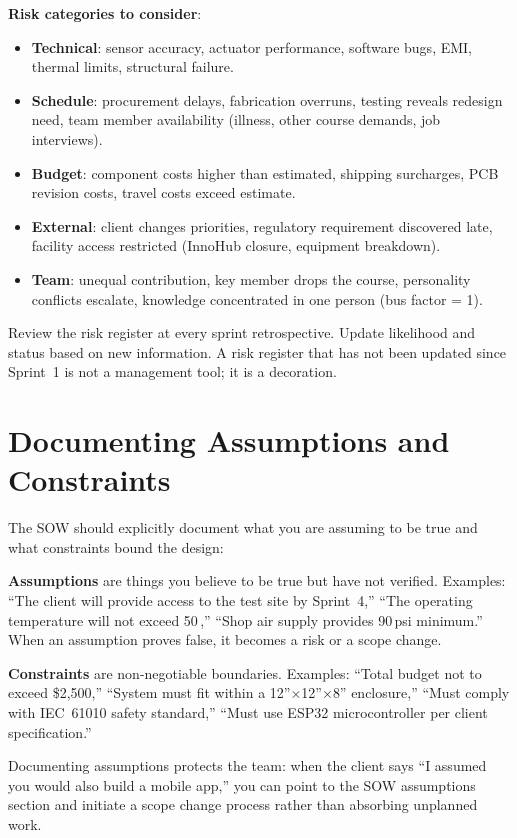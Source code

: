 \textbf{Risk categories to consider}:
\begin{itemize}[nosep,leftmargin=1.5em]
\item \textbf{Technical}: sensor accuracy, actuator performance, software bugs, EMI, thermal limits, structural failure.
\item \textbf{Schedule}: procurement delays, fabrication overruns, testing reveals redesign need, team member availability (illness, other course demands, job interviews).
\item \textbf{Budget}: component costs higher than estimated, shipping surcharges, PCB revision costs, travel costs exceed estimate.
\item \textbf{External}: client changes priorities, regulatory requirement discovered late, facility access restricted (InnoHub closure, equipment breakdown).
\item \textbf{Team}: unequal contribution, key member drops the course, personality conflicts escalate, knowledge concentrated in one person (bus factor = 1).
\end{itemize}

Review the risk register at every sprint retrospective. Update likelihood and status based on new information. A risk register that has not been updated since Sprint~1 is not a management tool; it is a decoration.

\section{Documenting Assumptions and Constraints}
The SOW should explicitly document what you are assuming to be true and what constraints bound the design:

\textbf{Assumptions} are things you believe to be true but have not verified. Examples: ``The client will provide access to the test site by Sprint~4,'' ``The operating temperature will not exceed 50\,\degC{},'' ``Shop air supply provides 90\,psi minimum.'' When an assumption proves false, it becomes a risk or a scope change.

\textbf{Constraints} are non-negotiable boundaries. Examples: ``Total budget not to exceed \$2,500,'' ``System must fit within a 12''$\times$12''$\times$8'' enclosure,'' ``Must comply with IEC~61010 safety standard,'' ``Must use ESP32 microcontroller per client specification.''

Documenting assumptions protects the team: when the client says ``I assumed you would also build a mobile app,'' you can point to the SOW assumptions section and initiate a scope change process rather than absorbing unplanned work.



